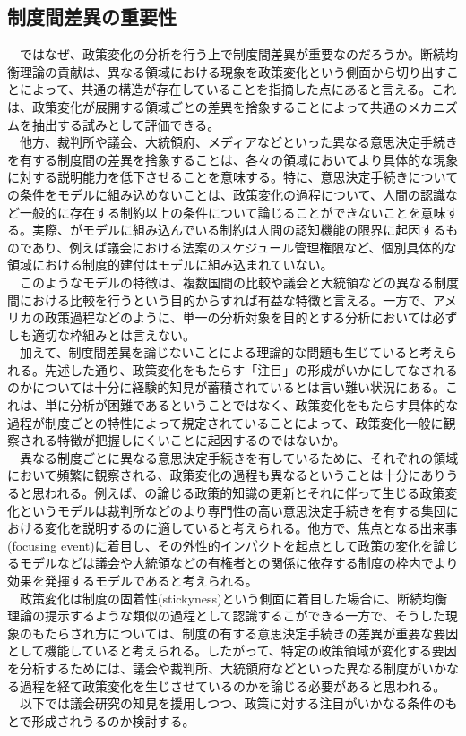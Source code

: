 \documentclass{article}
\begin{document}
\subsection{制度間差異の重要性}
　ではなぜ、政策変化の分析を行う上で制度間差異が重要なのだろうか。断続均衡理論の貢献は、異なる領域における現象を政策変化という側面から切り出すことによって、共通の構造が存在していることを指摘した点にあると言える。これは、政策変化が展開する領域ごとの差異を捨象することによって共通のメカニズムを抽出する試みとして評価できる。\\
　他方、裁判所や議会、大統領府、メディアなどといった異なる意思決定手続きを有する制度間の差異を捨象することは、各々の領域においてより具体的な現象に対する説明能力を低下させることを意味する。特に、意思決定手続きについての条件をモデルに組み込めないことは、政策変化の過程について、人間の認識など一般的に存在する制約以上の条件について論じることができないことを意味する。実際、\citep*{Baumgartner2010-rl}がモデルに組み込んでいる制約は人間の認知機能の限界に起因するものであり、例えば議会における法案のスケジュール管理権限など、個別具体的な領域における制度的建付はモデルに組み込まれていない。\\
　このようなモデルの特徴は、複数国間の比較や議会と大統領などの異なる制度間における比較を行うという目的からすれば有益な特徴と言える。一方で、アメリカの政策過程などのように、単一の分析対象を目的とする分析においては必ずしも適切な枠組みとは言えない。\\
　加えて、制度間差異を論じないことによる理論的な問題も生じていると考えられる。先述した通り、政策変化をもたらす「注目」の形成がいかにしてなされるのかについては十分に経験的知見が蓄積されているとは言い難い状況にある。これは、単に分析が困難であるということではなく、政策変化をもたらす具体的な過程が制度ごとの特性によって規定されていることによって、政策変化一般に観察される特徴が把握しにくいことに起因するのではないか。\\
　異なる制度ごとに異なる意思決定手続きを有しているために、それぞれの領域において頻繁に観察される、政策変化の過程も異なるということは十分にありうると思われる。例えば、\citet*{Baumgartner1993-bc, Baumgartner2010-rl}の論じる政策的知識の更新とそれに伴って生じる政策変化というモデルは裁判所などのより専門性の高い意思決定手続きを有する集団における変化を説明するのに適していると考えられる。他方で、焦点となる出来事(focusing event)に着目し、その外性的インパクトを起点として政策の変化を論じるモデル\citep*{Birkland1997-lq, Birkland1998-xp,Sabatier1993-id,Bertelli2013-zq}などは議会や大統領などの有権者との関係に依存する制度の枠内でより効果を発揮するモデルであると考えられる。\\
　政策変化は制度の固着性(stickyness)という側面に着目した場合に、断続均衡理論の提示するような類似の過程として認識するこができる一方で、そうした現象のもたらされ方については、制度の有する意思決定手続きの差異が重要な要因として機能していると考えられる。したがって、特定の政策領域が変化する要因を分析するためには、議会や裁判所、大統領府などといった異なる制度がいかなる過程を経て政策変化を生じさせているのかを論じる必要があると思われる。\\
　以下では議会研究の知見を援用しつつ、政策に対する注目がいかなる条件のもとで形成されうるのか検討する。\\
\end{document}
